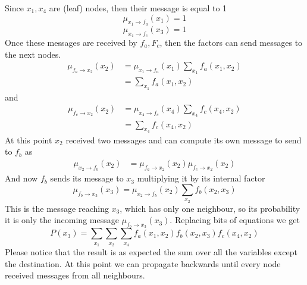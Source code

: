             Since $x_1, x_4$ are (leaf) nodes, then their message is equal to 1
            $$\mu_{x_1 \rightarrow f_a} (x_1) = 1$$
            $$\mu_{x_4 \rightarrow f_c} (x_3) = 1$$
            Once these messages are received by $f_a, F_c$, then the factors can send messages to the next nodes.
            \begin{align*}
                \mu_{f_a \rightarrow x_2} (x_2) &= \mu_{x_1 \rightarrow f_a} (x_1) \sum _{x_1} f_a(x_1, x_2) \\
                & = \sum _{x_1} f_a(x_1, x_2) 
            \end{align*}
            and
            \begin{align*}
                \mu_{f_c \rightarrow x_2} (x_2) &= \mu_{x_4 \rightarrow f_c} (x_4) \sum _{x_4} f_c(x_4, x_2) \\
                & = \sum _{x_4} f_c(x_4, x_2) 
            \end{align*}
            At this point $x_2$ received two messages and can compute its own message to send to $f_b$ as
            \begin{align*}
                \mu_{x_2 \rightarrow f_b} (x_2) &= \mu_{f_a \rightarrow x_2} (x_2) \mu_{f_c \rightarrow x_2} (x_2)
            \end{align*}
            And now $f_b$ sends its message to $x_3$ multiplying it by its internal factor
            $$\mu_{f_b \rightarrow x_3} (x_3) = \mu_{x_2 \rightarrow f_b} (x_2) \sum_{x_2} f_b (x_2, x_3)$$
            This is the message reaching $x_3$, which has only one neighbour, so its probability it is only the incoming message $\mu_{f_b \rightarrow x_3} (x_3)$. Replacing bits of equations we get
            $$P(x_3) = \sum _{x_1} \sum_{x_2} \sum_{x_4} f_a(x_1, x_2) f_b(x_2, x_3) f_c(x_4, x_2)$$
            Please notice that the result is as expected the sum over all the variables except the destination.
            At this point we can propagate backwards until every node received messages from all neighbours. 
        
